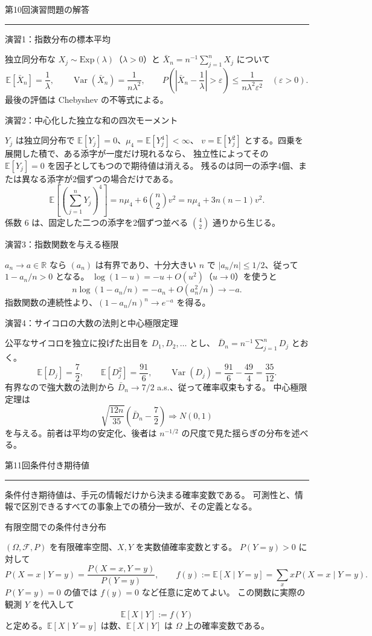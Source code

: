 \documentclass[a4paper,10pt,pdflatex,ja=standard,jafont=ipaex-type1,
  magstyle=real,scale=1]{bxjsarticle}
\newcommand{\coursename}{確率論と統計学 I}
\newcommand{\topic}[1]{\par\vspace{5pt}
  {\large\sffamily\mdseries\color{accent}#1}\par\vspace{2pt}}
\newcommand{\handouttitle}[1]{%
  \begin{center}
    {\Large\color{ink}#1}\par\vspace{3mm}
    {\color{accent}\rule{0.88\linewidth}{0.7pt}}
  \end{center}\vspace{-2mm}}
\newcommand{\keybox}[1]{\par\vspace{3pt}\begingroup
  \setlength{\fboxsep}{5pt}
  \colorbox{soft}{\parbox{\dimexpr\linewidth-2\fboxsep\relax}{#1}}%
  \endgroup\par\vspace{2pt}}
\newcommand{\F}{\mathcal F}
\newcommand{\R}{\mathbb R}
\newcommand{\E}{\mathbb E}
\newcommand{\Var}{\operatorname{Var}}
\begin{document}
\fontsize{10pt}{13.5pt}\selectfont
\begingroup
\fancyhead[L]{\small\color{ink}\coursename{}・前回の演習解答}
\handouttitle{第10回\quad 演習問題の解答}

\topic{演習1：指数分布の標本平均}
独立同分布な $X_j\sim\mathrm{Exp}(\lambda)$（$\lambda>0$）と
$\bar X_n=n^{-1}\sum_{j=1}^nX_j$ について
$$
  \E[\bar X_n]=\frac1\lambda,\qquad
  \Var(\bar X_n)=\frac1{n\lambda^2},\qquad
  P\left(\left|\bar X_n-\frac1\lambda\right|>\varepsilon\right)
     \le\frac1{n\lambda^2\varepsilon^2}\quad(\varepsilon>0).
$$
最後の評価は Chebyshev の不等式による。

\topic{演習2：中心化した独立な和の四次モーメント}
$Y_j$ は独立同分布で $\E[Y_j]=0$、$\mu_4=\E[Y_j^4]<\infty$、
$v=\E[Y_j^2]$ とする。四乗を展開した積で、ある添字が一度だけ現れるなら、
独立性によってその $\E[Y_j]=0$ を因子としてもつので期待値は消える。
残るのは同一の添字4個、または異なる添字が2個ずつの場合だけである。
$$
  \E\left[\left(\sum_{j=1}^nY_j\right)^4\right]
     =n\mu_4+6\binom n2v^2=n\mu_4+3n(n-1)v^2.
$$
係数 $6$ は、固定した二つの添字を2個ずつ並べる $\binom42$ 通りから生じる。

\topic{演習3：指数関数を与える極限}
$a_n\to a\in\R$ なら $(a_n)$ は有界であり、十分大きい $n$ で
$|a_n/n|\le1/2$、従って $1-a_n/n>0$ となる。
$\log(1-u)=-u+O(u^2)$（$u\to0$）を使うと
$$
  n\log(1-a_n/n)=-a_n+O(a_n^2/n)\longrightarrow-a.
$$
指数関数の連続性より、$(1-a_n/n)^n\to e^{-a}$ を得る。

\topic{演習4：サイコロの大数の法則と中心極限定理}
公平なサイコロを独立に投げた出目を $D_1,D_2,\ldots$ とし、
$\bar D_n=n^{-1}\sum_{j=1}^nD_j$ とおく。
$$
  \E[D_j]=\frac72,\qquad
  \E[D_j^2]=\frac{91}{6},\qquad
  \Var(D_j)=\frac{91}{6}-\frac{49}{4}=\frac{35}{12}.
$$
有界なので強大数の法則から $\bar D_n\to7/2$ a.s.、従って確率収束もする。
中心極限定理は
$$
  \sqrt{\frac{12n}{35}}\left(\bar D_n-\frac72\right)
      \Rightarrow N(0,1)
$$
を与える。前者は平均の安定化、後者は $n^{-1/2}$ の尺度で見た揺らぎの分布を述べる。
\clearpage
\endgroup

\handouttitle{第11回\quad 条件付き期待値}
\keybox{条件付き期待値は、手元の情報だけから決まる確率変数である。
可測性と、情報で区別できるすべての事象上での積分一致が、その定義となる。}

\topic{有限空間での条件付き分布}
$(\Omega,\F,P)$ を有限確率空間、$X,Y$ を実数値確率変数とする。
$P(Y=y)>0$ に対して
$$P(X=x\mid Y=y)=\frac{P(X=x,Y=y)}{P(Y=y)},\qquad
 f(y):=\E[X\mid Y=y]=\sum_x xP(X=x\mid Y=y).$$
$P(Y=y)=0$ の値では $f(y)=0$ など任意に定めてよい。
この関数に実際の観測 $Y$ を代入して
$$\E[X\mid Y]:=f(Y)$$
と定める。$\E[X\mid Y=y]$ は数、$\E[X\mid Y]$ は $\Omega$ 上の確率変数である。
\end{document}
